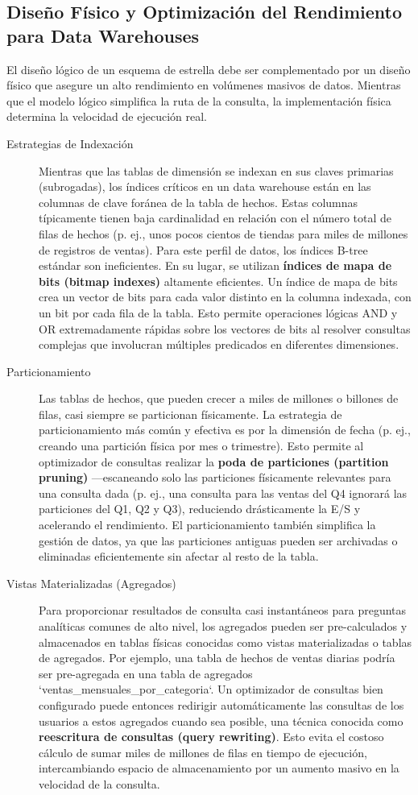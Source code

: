 \documentclass{article}
\begin{document}
\subsection{Diseño Físico y Optimización del Rendimiento para Data Warehouses}
El diseño lógico de un esquema de estrella debe ser complementado por un diseño físico que asegure un alto rendimiento en volúmenes masivos de datos. Mientras que el modelo lógico simplifica la ruta de la consulta, la implementación física determina la velocidad de ejecución real.
\begin{description}
    \item[Estrategias de Indexación] Mientras que las tablas de dimensión se indexan en sus claves primarias (subrogadas), los índices críticos en un data warehouse están en las columnas de clave foránea de la tabla de hechos. Estas columnas típicamente tienen baja cardinalidad en relación con el número total de filas de hechos (p. ej., unos pocos cientos de tiendas para miles de millones de registros de ventas). Para este perfil de datos, los índices B-tree estándar son ineficientes. En su lugar, se utilizan \textbf{índices de mapa de bits (bitmap indexes)} altamente eficientes. Un índice de mapa de bits crea un vector de bits para cada valor distinto en la columna indexada, con un bit por cada fila de la tabla. Esto permite operaciones lógicas AND y OR extremadamente rápidas sobre los vectores de bits al resolver consultas complejas que involucran múltiples predicados en diferentes dimensiones.

    \item[Particionamiento] Las tablas de hechos, que pueden crecer a miles de millones o billones de filas, casi siempre se particionan físicamente. La estrategia de particionamiento más común y efectiva es por la dimensión de fecha (p. ej., creando una partición física por mes o trimestre). Esto permite al optimizador de consultas realizar la \textbf{poda de particiones (partition pruning)} —escaneando solo las particiones físicamente relevantes para una consulta dada (p. ej., una consulta para las ventas del Q4 ignorará las particiones del Q1, Q2 y Q3), reduciendo drásticamente la E/S y acelerando el rendimiento. El particionamiento también simplifica la gestión de datos, ya que las particiones antiguas pueden ser archivadas o eliminadas eficientemente sin afectar al resto de la tabla.

    \item[Vistas Materializadas (Agregados)] Para proporcionar resultados de consulta casi instantáneos para preguntas analíticas comunes de alto nivel, los agregados pueden ser pre-calculados y almacenados en tablas físicas conocidas como vistas materializadas o tablas de agregados. Por ejemplo, una tabla de hechos de ventas diarias podría ser pre-agregada en una tabla de agregados `ventas_mensuales_por_categoria`. Un optimizador de consultas bien configurado puede entonces redirigir automáticamente las consultas de los usuarios a estos agregados cuando sea posible, una técnica conocida como \textbf{reescritura de consultas (query rewriting)}. Esto evita el costoso cálculo de sumar miles de millones de filas en tiempo de ejecución, intercambiando espacio de almacenamiento por un aumento masivo en la velocidad de la consulta.
\end{description}
\end{document}
